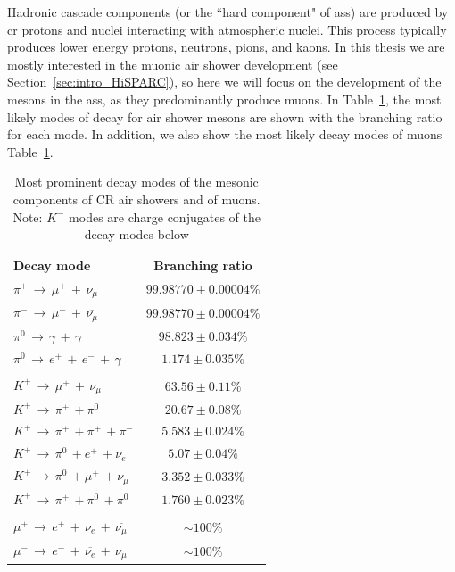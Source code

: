 Hadronic cascade components (or the ``hard component" of \glspl{as}) are produced by \gls{cr} protons and nuclei interacting with atmospheric nuclei. This process typically produces lower energy protons, neutrons, pions, and kaons. In this thesis we are mostly interested in the muonic air shower development (see Section~\ref{sec:intro_HiSPARC}), so here we will focus on the development of the mesons in the \glspl{as}, as they predominantly produce muons. In Table~\ref{tab:meson_decay}, the most likely modes of decay for air shower mesons are shown with the branching ratio for each mode. In addition, we also show the most likely decay modes of muons Table~\ref{tab:meson_decay}. 


\begin{table}[ht!]
	\begin{center}
		\caption{ Most prominent decay modes of the mesonic components of CR air showers and of muons. Note: $K^-$ modes are charge conjugates of the decay modes below \citep{particle_data_group_review_2020}}
		\label{tab:meson_decay}
		\begin{tabular}{lc}
			\hline
			Decay mode & Branching ratio  \\
			\hline
			{$ \pi^{+} \, \rightarrow \, \mu^{+} \, + \, \nu_{\mu} $}	 &  $99.98770 \pm 0.00004 \%$ \\
			{$ \pi^{-} \, \rightarrow \, \mu^{-} \, + \, \overline{\nu_{\mu}} $}  &  $99.98770 \pm 0.00004 \% $ \\
			{$ \pi^{0} \, \rightarrow \, \gamma \, + \, \gamma $} &  $98.823 \pm 0.034 \% $ \\
			{$ \pi^{0} \, \rightarrow \, e^+ \, + \, e^-  \, + \, \gamma $} &  $1.174 \pm 0.035 \% $ \\
			{}  & {} \\
			{$K^+ \, \rightarrow \, \mu^{+} \, + \, \nu_{\mu}$}  &  $63.56 \pm 0.11 \% $ \\
			{$K^+ \, \rightarrow \, \pi^{+} \, + \pi^{0} $}  &  $20.67 \pm 0.08 \% $ \\
			{$K^+ \, \rightarrow \, \pi^{+} \, + \pi^{+} \, + \pi^{-}$}  &  $5.583 \pm 0.024 \% $ \\
			{$K^+ \, \rightarrow \, \pi^{0} \, + e^{+} \, + \nu_{e}$}  & $5.07 \pm 0.04 \% $ \\ 		 		 		 		
			{$K^+ \, \rightarrow \, \pi^{0} \, + \mu^{+} \, + \nu_{\mu}$}  &  $3.352 \pm 0.033 \% $\\ 		 		 		 		
			{$K^+ \, \rightarrow \, \pi^{+} \, + \pi^{0} \, + \pi^{0}$}  &  $1.760 \pm 0.023 \% $\\
			{}  & {} \\
			{$ \mu^{+} \, \rightarrow \, e^{+} \, + \, \nu_e \, + \, \overline{\nu_{\mu}} $}  &  $\sim 100\%$\\	
			{$ \mu^{-} \, \rightarrow \, e^{-} \, + \, \overline{\nu_e} \, + \, \nu_{\mu} $}  &  $\sim 100\%$\\	
			\hline
		\end{tabular}
	\end{center}
\end{table}


